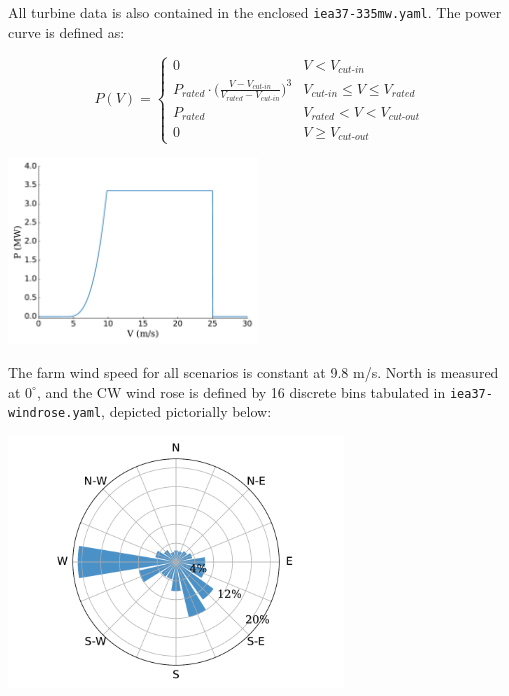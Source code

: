 \documentclass[10pt]{article}
\begin{document}
        \noindent All turbine data is also contained in the enclosed \texttt{iea37-335mw.yaml}. The power curve is defined as:   

        \begin{minipage}{0.53\textwidth}
            \begin{equation*}
                P(V) = 
                \begin{cases} 
                    0 & V < V_{\textit{cut-in}} \\
                    P_{\textit{rated}}\cdot\bigg(\frac{V-V_{\textit{cut-in}}}{V_{\textit{rated}}-V_{\textit{cut-in}}}\bigg)^3 & V_{\textit{cut-in}}\leq V \leq V_{\textit{rated}} \\
                    P_{\textit{rated}} & V_{\textit{rated}} < V < V_{\textit{cut-out}} \\
                    0 & V \geq V_{\textit{cut-out}}
                \end{cases}
            \label{eq:power}
            \end{equation*}
        \end{minipage}\quad
        \begin{minipage}{0.53\textwidth}
            \includegraphics[width=2.6in]{iea37-335mw-pcurve}
        \end{minipage}

        The farm wind speed for all scenarios is constant at 9.8 m/s. North is measured at $0^{\circ}$, and the CW wind rose is defined by 16 discrete bins tabulated in \texttt{iea37-windrose.yaml}, depicted pictorially below:
        \begin{center}
            \includegraphics[width=3.5in]{iea37-windrose}
        \end{center}
        
\end{document}
